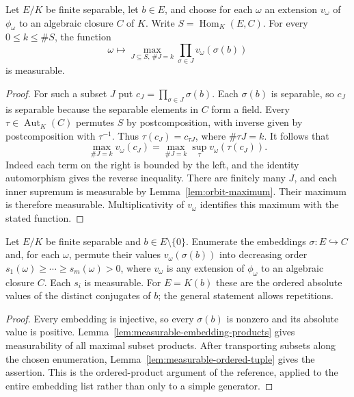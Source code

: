 \begin{lemma}
\label{lem:measurable-embedding-products}
\leanok
{}
Let $E/K$ be finite separable, let $b\in E$, and choose for each
$\omega$ an extension $v_\omega$ of $\phi_\omega$ to an algebraic
closure $C$ of $K$. Write $S=\operatorname{Hom}_K(E,C)$.
For every $0\leq k\leq\#S$, the function
\[
 \omega\longmapsto \max_{J\subseteq S,\,\#J=k}
       \prod_{\sigma\in J}v_\omega(\sigma(b))
\]
is measurable.
\end{lemma}
\begin{proof}
For such a subset $J$ put $c_J=\prod_{\sigma\in J}\sigma(b)$.
Each $\sigma(b)$ is separable, so $c_J$ is separable because the
separable elements in $C$ form a field. Every $\tau\in\operatorname{Aut}_K(C)$
permutes $S$ by postcomposition, with inverse given by postcomposition
with $\tau^{-1}$. Thus $\tau(c_J)=c_{\tau J}$, where $\#\tau J=k$.
It follows that
\[
 \max_{\#J=k}v_\omega(c_J)
 =\max_{\#J=k}\sup_\tau v_\omega(\tau(c_J)).
\]
Indeed each term on the right is bounded by the left, and the identity
automorphism gives the reverse inequality. There are finitely many $J$,
and each inner supremum is measurable by Lemma~\ref{lem:orbit-maximum}.
Their maximum is therefore measurable. Multiplicativity of $v_\omega$
identifies this maximum with the stated function.
\end{proof}

\begin{lemma}\label{lem:ordered-conjugate-values}
\leanok
{}
Let $E/K$ be finite separable and $b\in E\setminus\{0\}$. Enumerate
the embeddings $\sigma:E\hookrightarrow C$ and, for each $\omega$,
permute their values $v_\omega(\sigma(b))$ into decreasing order
$s_1(\omega)\geq\cdots\geq s_m(\omega)>0$, where $v_\omega$ is any
extension of $\phi_\omega$ to an algebraic closure $C$. Each $s_i$ is
measurable. For $E=K(b)$ these are the ordered absolute values of the
distinct conjugates of $b$; the general statement allows repetitions.
\end{lemma}
\begin{proof}
Every embedding is injective, so every $\sigma(b)$ is nonzero and its
absolute value is positive. Lemma~\ref{lem:measurable-embedding-products}
gives measurability of all maximal subset products. After transporting
subsets along the chosen enumeration, Lemma~\ref{lem:measurable-ordered-tuple}
gives the assertion. This is the ordered-product argument of the reference,
applied to the entire embedding list rather than only to a simple generator.
\end{proof}

